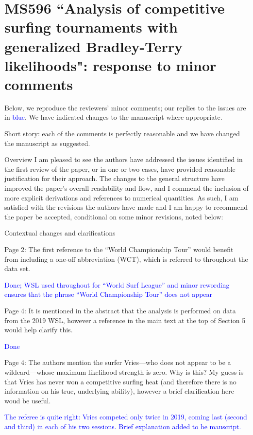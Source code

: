 \documentclass[12pt]{article}
\begin{document}
\section*{MS596 ``Analysis of competitive surfing tournaments with generalized Bradley-Terry likelihoods": response to minor comments}

Below, we reproduce the reviewers' minor comments; our replies to
the issues are in \textcolor{blue}{blue}.  We have indicated changes
to the manuscript where appropriate.

Short story: each of the  comments is perfectly reasonable and we have 
changed the manuscript as suggested.




Overview I am pleased to see the authors have addressed the issues
identified in the first review of the paper, or in one or two cases,
have provided reasonable justification for their approach. The changes
to the general structure have improved the paper’s overall readability
and flow, and I commend the inclusion of more explicit derivations and
references to numerical quantities. As such, I am satisfied with the
revisions the authors have made and I am happy to recommend the paper
be accepted, conditional on some minor revisions, noted below:



Contextual changes and clarifications

Page 2: The first reference to the ``World Championship Tour'' would
benefit from including a one-off abbreviation (WCT), which is referred
to throughout the data set.

\textcolor{blue}{Done; WSL used throughout for ``World Surf League''
  and minor rewording ensures that the phrase ``World Championship
  Tour'' does not appear}

Page 4: It is mentioned in the abstract that the analysis is performed
on data from the 2019 WSL, however a reference in the main text at the
top of Section 5 would help clarify this.

\textcolor{blue}{Done}


Page 4: The authors mention the surfer Vries---who does not appear to
be a wildcard---whose maximum likelihood strength is zero. Why is
this? My guess is that Vries has never won a competitive surfing heat
(and therefore there is no information on his true, underlying
ability), however a brief clarification here woud be useful.

\textcolor{blue}{The referee is quite right: Vries competed only twice
  in 2019, coming last (second and third) in each of his two sessions.
  Brief explanation added to he mauscript.}
\end{document}
